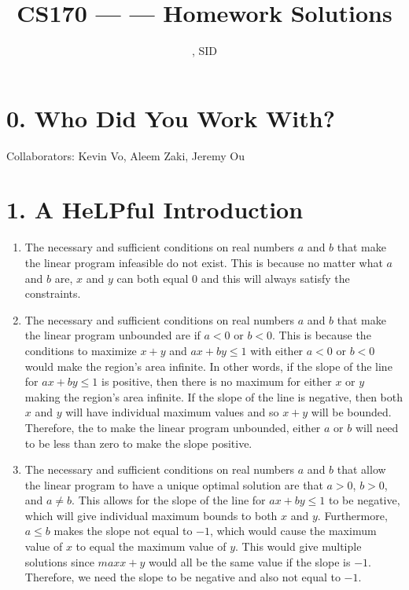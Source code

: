 \documentclass[11pt]{article}
\title{CS170 --- \Session --- Homework \Homework \space Solutions}
\author{\Name, SID \SID}
\date{}
\begin{document}
\maketitle

\section*{0. Who Did You Work With?}

Collaborators: Kevin Vo, Aleem Zaki, Jeremy Ou



\newpage
\section*{1. A HeLPful Introduction}
\begin{enumerate}[label=(\alph*)]
\item
The necessary and sufficient conditions on real numbers $a$ and $b$ that make the linear program infeasible do not exist. This is because no matter what $a$ and $b$ are, $x$ and $y$ can both equal $0$ and this will always satisfy the constraints.



\item
The necessary and sufficient conditions on real numbers $a$ and $b$ that make the linear program unbounded are if $a < 0$ or $b < 0$. This is because the conditions to maximize $x + y$ and $ax + by \leq 1$ with either $a < 0$ or $b < 0$ would make the region's area infinite. In other words, if the slope of the line for $ax + by \leq 1$ is positive, then there is no maximum for either $x$ or $y$ making the region's area infinite. If the slope of the line is negative, then both $x$ and $y$ will have individual maximum values and so $x + y$ will be bounded. Therefore, the to make the linear program unbounded, either $a$ or $b$ will need to be less than zero to make the slope positive.



\item
The necessary and sufficient conditions on real numbers $a$ and $b$ that allow the linear program to have a unique optimal solution are that $a > 0$, $b > 0$, and $a \neq b$. This allows for the slope of the line for $ax + by \leq 1$ to be negative, which will give individual maximum bounds to both $x$ and $y$. Furthermore, $a \leq b$ makes the slope not equal to $-1$, which would cause the maximum value of $x$ to equal the maximum value of $y$. This would give multiple solutions since $max x + y$ would all be the same value if the slope is $-1$. Therefore, we need the slope to be negative and also not equal to $-1$.
\end{enumerate}
\end{document}
